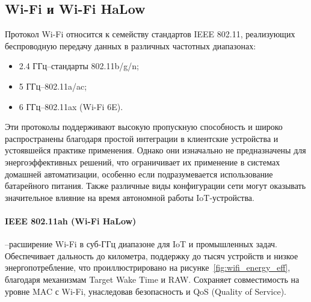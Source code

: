 \documentclass[14pt, a4paper]{extreport}
\begin{document}
\subsection{Wi-Fi и Wi-Fi HaLow}

Протокол Wi-Fi относится к семейству стандартов IEEE 802.11, реализующих беспроводную передачу данных в различных частотных диапазонах:
\begin{itemize}
    \item 2.4 ГГц--стандарты 802.11b/g/n;
    \item 5 ГГц--802.11a/ac;
    \item 6 ГГц--802.11ax (Wi-Fi 6E).
\end{itemize}

Эти протоколы поддерживают высокую пропускную способность и широко распространены благодаря простой интеграции в клиентские устройства и устоявшейся практике применения. Однако они
изначально не предназначены для энергоэффективных решений, что ограничивает их применение в системах домашней автоматизации, особенно если подразумевается использование батарейного
питания. Также различные виды конфигурации сети могут оказывать значительное влияние на время автономной работы IoT-устройства. \cite{WifiSmartHome}

\paragraph{IEEE 802.11ah (Wi-Fi HaLow)}--расширение Wi-Fi в суб-ГГц диапазоне для IoT и промышленных задач. Обеспечивает дальность до километра, поддержку до тысяч устройств и
низкое энергопотребление, что проиллюстрировано на рисунке~\ref{fig:wifi_energy_eff}, благодаря механизмам Target Wake Time и RAW. Сохраняет совместимость на уровне MAC с Wi-Fi,
унаследовав безопасность и QoS (Quality of Service).
\end{document}
